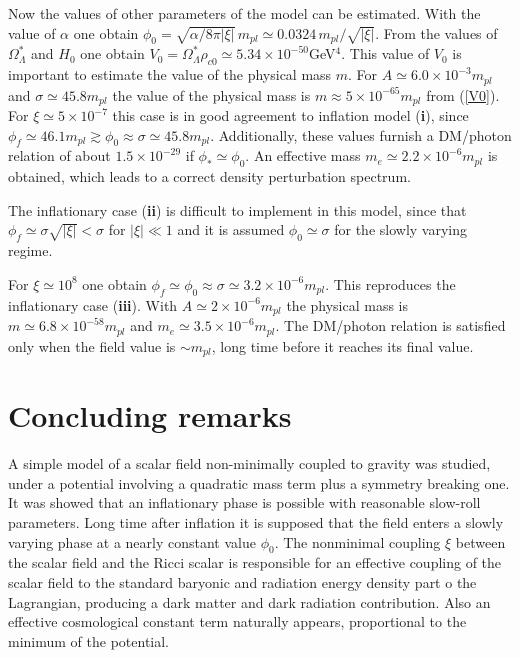 \documentclass[preprintnumbers,amsmath,amssymb,nofootinbib]{revtex4}
\begin{document}
Now the values of other parameters of the model can be estimated. With the value of $\alpha$ one obtain $\phi_0=\sqrt{\alpha/8\pi |\xi|}\,m_{pl} \simeq 0.0324\, m_{pl}/\sqrt{|\xi|}$. From the values of $\Omega^*_\Lambda$ and $H_0$ one obtain $V_0 = \Omega^*_\Lambda \rho_{c0} \simeq 5.34\times 10^{-50}$GeV$^4$. This value of $V_0$ is important to estimate the value of the physical mass $m$. For $A\simeq 6.0\times 10^{-3}m_{pl}$ and $\sigma \simeq 45.8m_{pl}$ the value of the physical mass is $m\approx 5\times 10^{-65} m_{pl}$ from (\ref{V0}). For $\xi\simeq 5\times 10^{-7}$ this case is in good agreement to inflation model ({\bf i}), since $\phi_f\simeq 46.1m_{pl} \gtrsim \phi_0 \approx \sigma \simeq 45.8 m_{pl}$. Additionally, these values furnish a DM/photon relation of about $1.5\times 10^{-29}$ if $\phi_* \simeq \phi_0$. An effective mass $m_e \simeq 2.2\times 10^{-6}m_{pl}$ is obtained, which leads to a correct density perturbation spectrum.

The inflationary case ({\bf ii}) is difficult to implement in this model, since that $\phi_f \simeq \sigma \sqrt{|\xi|} < \sigma$ for $|\xi| \ll 1$ and it is assumed $\phi_0 \simeq \sigma$ for the slowly varying regime.

For $\xi\simeq 10^{8}$ one obtain $\phi_f\simeq  \phi_0 \approx \sigma \simeq 3.2\times 10^{-6} m_{pl}$. This reproduces the inflationary case ({\bf iii}). With $A\simeq 2\times 10^{-6} m_{pl}$ the physical mass is $m\simeq 6.8\times 10^{-58} m_{pl}$ and $m_e\simeq 3.5\times 10^{-6}m_{pl} $. The DM/photon relation is satisfied only when the field value is $\sim m_{pl}$, long time before it reaches its final value.

\section{Concluding remarks}

A simple model of a scalar field non-minimally coupled to gravity was studied, under a potential involving a quadratic mass term plus a symmetry breaking one. It was showed that an inflationary phase is possible with reasonable  slow-roll parameters. Long time after inflation it is supposed that the field enters a slowly varying phase at a nearly constant value $\phi_0$. The nonminimal coupling $\xi$ between the scalar field and the Ricci scalar is responsible for an effective coupling of the scalar field to the standard baryonic and radiation energy density part o the Lagrangian, producing a dark matter and dark radiation contribution. Also an effective cosmological constant term naturally appears, proportional to the minimum of the potential.
\end{document}
